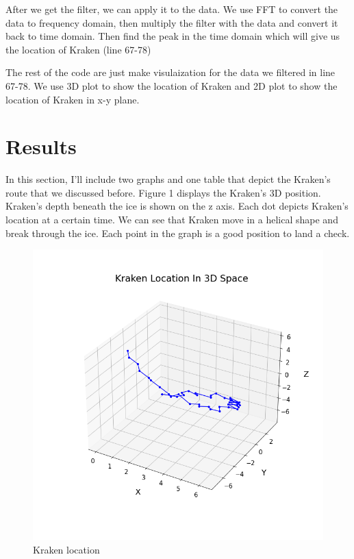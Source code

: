 \documentclass[12pt]{article}%
\begin{document}
After we get the filter, we can apply it to the data. We use FFT to convert the data to frequency domain, then multiply the filter with the data and convert it back to time domain. Then find the peak in the time domain which will give us the location of Kraken (line 67-78)

The rest of the code are just make visulaization for the data we filtered in line 67-78. We use 3D plot to show the location of Kraken and 2D plot to show the location of Kraken in x-y plane.

\section{Results}
In this section, I'll include two graphs and one table that depict the Kraken's route that we discussed before. Figure 1 displays the Kraken's 3D position. Kraken's depth beneath the ice is shown on the z axis. Each dot depicts Kraken's location at a certain time. We can see that Kraken move in a helical shape and break through the ice. Each point in the graph is a good position to land a check.
\begin{figure}[H]
    \centering
    \includegraphics[width=1\textwidth]{Kraken location.png}
    \caption{Kraken location}\label{fig:kraken_location}
\end{figure}
\end{document}
